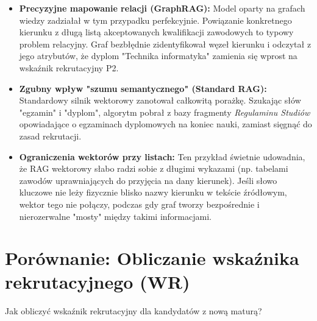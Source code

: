 \begin{tcolorbox}[colback=green!5!white,colframe=green!50!black,title=Wnioski i obserwacje]
    \begin{itemize}
        \item \textbf{Precyzyjne mapowanie relacji (GraphRAG):} Model oparty na grafach wiedzy zadziałał w tym przypadku perfekcyjnie. Powiązanie konkretnego kierunku z długą listą akceptowanych kwalifikacji zawodowych to typowy problem relacyjny. Graf bezbłędnie zidentyfikował węzeł kierunku i odczytał z jego atrybutów, że dyplom "Technika informatyka" zamienia się wprost na wskaźnik rekrutacyjny P2.
        \item \textbf{Zgubny wpływ "szumu semantycznego" (Standard RAG):} Standardowy silnik wektorowy zanotował całkowitą porażkę. Szukając słów "egzamin" i "dyplom", algorytm pobrał z bazy fragmenty \textit{Regulaminu Studiów} opowiadające o egzaminach dyplomowych na koniec nauki, zamiast sięgnąć do zasad rekrutacji.
        \item \textbf{Ograniczenia wektorów przy listach:} Ten przykład świetnie udowadnia, że RAG wektorowy słabo radzi sobie z długimi wykazami (np. tabelami zawodów uprawniających do przyjęcia na dany kierunek). Jeśli słowo kluczowe nie leży fizycznie blisko nazwy kierunku w tekście źródłowym, wektor tego nie połączy, podczas gdy graf tworzy bezpośrednie i nierozerwalne "mosty" między takimi informacjami.
    \end{itemize}
\end{tcolorbox}
\vspace{1em}

\newpage

\section*{Porównanie: Obliczanie wskaźnika rekrutacyjnego (WR)}

\begin{tcolorbox}[colback=blue!5!white,colframe=blue!75!black,title=Pytanie użytkownika]
    Jak obliczyć wskaźnik rekrutacyjny dla kandydatów z nową maturą?
\end{tcolorbox}


